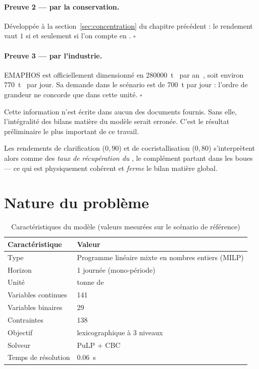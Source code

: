\paragraph{Preuve 2 --- par la conservation.}
Développée à la section~\ref{sec:concentration} du chapitre précédent : le rendement vaut
$1$ si et seulement si l'on compte en \PdeuxOcinq{}. \hfill$\square$

\paragraph{Preuve 3 --- par l'industrie.}
EMAPHOS est officiellement dimensionné en \SI{280000}{\tonne}~\PdeuxOcinq{} par
an~\cite{ocp-emaphos}, soit environ \SI{770}{\tonne}~\PdeuxOcinq{} par jour. Sa demande dans
le scénario est de \SI{700}{\tonne} par jour : l'ordre de grandeur ne concorde que dans
cette unité. \hfill$\square$

\begin{alerte}[title={Portée de ce résultat}]
Cette information n'est écrite dans aucun des documents fournis. Sans elle, l'intégralité
des bilans matière du modèle serait erronée. C'est le résultat préliminaire le plus
important de ce travail.

Les rendements de clarification ($0{,}90$) et de cocristallisation ($0{,}80$) s'interprètent
alors comme des \emph{taux de récupération du \PdeuxOcinq{}}, le complément partant dans les
boues --- ce qui est physiquement cohérent et \emph{ferme} le bilan matière global.
\end{alerte}

\section{Nature du problème}

\begin{table}[H]
\centering
\caption{Caractéristiques du modèle (valeurs mesurées sur le scénario de référence)}
\label{tab:nature-modele}
\begin{tabular}{@{}ll@{}}
\toprule
\textbf{Caractéristique} & \textbf{Valeur} \\
\midrule
Type & Programme linéaire mixte en nombres entiers (MILP) \\
Horizon & 1 journée (mono-période) \\
Unité & tonne de \PdeuxOcinq{} \\
Variables continues & 141 \\
Variables binaires & 29 \\
Contraintes & 138 \\
Objectif & lexicographique à 3 niveaux \\
Solveur & PuLP + CBC \\
Temps de résolution & \SI{0.06}{\second} \\
\bottomrule
\end{tabular}
\end{table}

